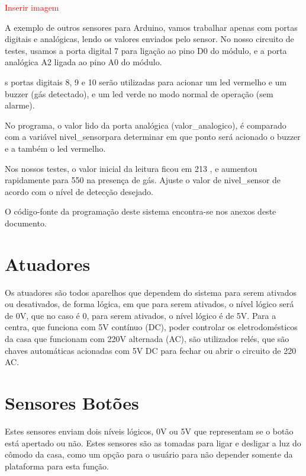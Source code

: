 \textcolor{red}{Inserir imagem}

\par A exemplo de outros sensores para Arduino, vamos trabalhar apenas com portas digitais e analógicas, lendo os valores enviados pelo sensor. No nosso circuito de testes, usamos a porta digital 7 para ligação ao pino D0 do módulo, e a porta analógica A2 ligada ao pino A0 do módulo.
\par s portas digitais 8, 9 e 10 serão utilizadas para acionar um led vermelho e um buzzer (gás detectado), e um led verde no modo normal de operação (sem alarme).
\par No programa, o valor lido da porta analógica (valor_analogico), é comparado com a variável nivel_sensorpara determinar em que ponto será acionado o buzzer e a também o led vermelho.
\par Nos nossos testes, o valor inicial da leitura ficou em 213 , e aumentou rapidamente para 550 na presença de gás. Ajuste o valor de nivel_sensor de acordo com o nível de detecção desejado.
\par O código-fonte da programação deste sistema encontra-se nos anexos deste documento.

\section{Atuadores}
\par Os atuadores são todos aparelhos que dependem do sistema para serem ativados ou desativados, de forma lógica, em que para serem ativados, o nível lógico será de 0V, que no caso é 0, para serem ativados, o nível lógico é de 5V. Para a centra, que funciona com 5V contínuo (DC), poder controlar os eletrodomésticos da casa que funcionam com 220V alternada (AC), são utilizados relés, que são chaves automáticas acionadas com 5V DC para fechar ou abrir o circuito de 220 AC.

\section{Sensores Botões}
\par Estes sensores enviam dois níveis lógicos, 0V ou 5V que representam se o botão está apertado ou não. Estes sensores são as tomadas para ligar e desligar a  luz do cômodo da casa, como um opção para o usuário para não depender somente da plataforma para esta função.

